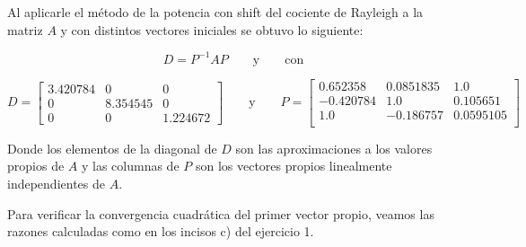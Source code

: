 \documentclass[11pt]{article}
\begin{document}
\noindent
Al aplicarle el método de la potencia con shift del cociente de Rayleigh a la matriz $A$ y con distintos vectores iniciales se obtuvo lo siguiente:

\[
 D = P^{-1}AP
 \qquad\text{y}\qquad
\text{con}
 \]

\[
 D =
 \begin{bmatrix}
 3.420784 & 0 & 0 \\
 0 & 8.354545 & 0 \\
 0 & 0 & 1.224672
\end{bmatrix}
 \qquad\text{y}\qquad
P =
 \begin{bmatrix}
  0.652358 &  0.0851835 & 1.0      \\
 -0.420784  & 1.0    &    0.105651 \\
  1.0     &  -0.186757 &  0.0595105 \\
\end{bmatrix}
 \]

Donde los elementos de la diagonal de $D$ son las aproximaciones a los valores propios de $A$ y las columnas de $P$ son los vectores propios linealmente independientes de $A$.

Para verificar la convergencia cuadrática del primer vector propio, veamos las razones calculadas como en los incisos c) del ejercicio 1.
\end{document}
